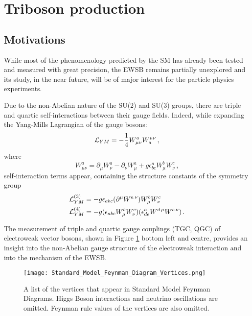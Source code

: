 \section{Triboson production}
\subsection{Motivations}
While most of the phenomenology predicted by the SM has already been tested and measured with great precision, the EWSB remains partially unexplored and its study, in the near future, will be of major interest for the particle physics experiments.

Due to the non-Abelian nature of the SU(2) and SU(3) groups, there are triple and quartic self-interactions between their gauge fields.
Indeed, while expanding the Yang-Mills Lagrangian of the gauge bosons:
\begin{equation}
\mathcal{L}_{YM} = -\frac{1}{4} W^a_{\mu\nu} W_a^{\mu\nu}\,,
\end{equation}
where
\begin{equation}
W^a_{\mu\nu} = \partial_\mu W^a_\nu - \partial_\nu W^a_\mu + g \epsilon^a_{b c} W^b_\mu W^c_\nu\,,
\end{equation}
self-interaction terms appear, containing the structure constants of the symmetry group
\begin{equation}
  \begin{split}
    \mathcal{L}_{YM}^{(3)} &= -g \epsilon_{a b c} (\partial^\mu W^{a \, \nu}) W^b_\mu W^c_\nu
    \\
    \mathcal{L}_{YM}^{(4)} &= -g (\epsilon_{a b c} W^b_\mu W^c_\nu) (\epsilon^a_{d e} W^{d\,\mu} W^{e\,\nu})\,.
  \end{split}
\end{equation}

The measurement of triple and quartic gauge couplings (TGC, QGC) of electroweak vector bosons, shown in Figure \ref{fig:SMvertices} bottom left and centre, provides an insight into the non-Abelian gauge structure of the electroweak interaction and into the mechanism of the EWSB.
%
\begin{figure}
	\centering
	\texttt{[image: Standard\_Model\_Feynman\_Diagram\_Vertices.png]}
	\caption{A list of the vertices that appear in Standard Model Feynman Diagrams. Higgs Boson interactions and neutrino oscillations are omitted. Feynman rule values of the vertices are also omitted. \cite{wikipedia_SM_feynman_vertices}}
        \label{fig:SMvertices}
\end{figure}

